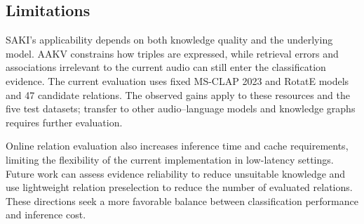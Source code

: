 \subsection{Limitations}\label{sec:limitations}

SAKI's applicability depends on both knowledge quality and the underlying model. AAKV constrains how triples are expressed, while retrieval errors and associations irrelevant to the current audio can still enter the classification evidence.  The current evaluation uses fixed MS-CLAP 2023 and RotatE models and 47 candidate relations. The observed gains apply to these resources and the five test datasets; transfer to other audio--language models and knowledge graphs requires further evaluation.

Online relation evaluation also increases inference time and cache requirements, limiting the flexibility of the current implementation in low-latency settings. Future work can assess evidence reliability to reduce unsuitable knowledge and use lightweight relation preselection to reduce the number of evaluated relations. These directions seek a more favorable balance between classification performance and inference cost.


\FloatBarrier
